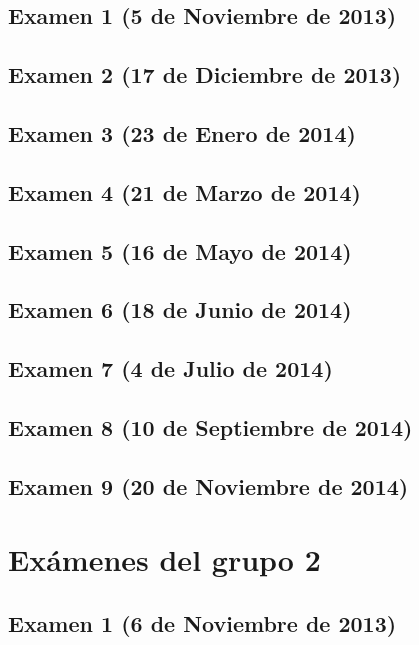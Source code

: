 \documentclass[a4paper,12pt,twoside]{book}
\begin{document}
\section{Examen 1 (5 de Noviembre de 2013)}
\section{Examen 2 (17 de Diciembre de 2013)}
\section{Examen 3 (23 de Enero de 2014)}
 \label{examen_13_14_1_3}
\section{Examen 4 (21 de Marzo de 2014)}
\section{Examen 5 (16 de Mayo de 2014)}
\section{Examen 6 (18 de Junio de 2014)}
 \label{examen_13_14_1_6}
\section{Examen 7 (4 de Julio de 2014)}
 \label{examen_13_14_1_7}
\section{Examen 8 (10 de Septiembre de 2014)}
 \label{examen_13_14_1_8}
\section{Examen 9 (20 de Noviembre de 2014)}
 \label{examen_13_14_1_9}

\chapter{Exámenes del grupo 2}
\section{Examen 1 (6 de Noviembre de 2013)}
\end{document}
